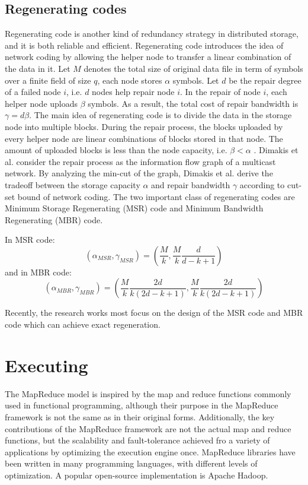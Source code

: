 \documentclass{article} %
\begin{document}
\subsection{Regenerating codes}
Regenerating code is another kind of redundancy strategy in distributed storage, and it is both reliable and efficient. Regenerating code introduces the idea of network coding by allowing the helper node to transfer a linear combination of the data in it. Let $M$ denotes the total size of original data file in term of symbols over a finite field of size $q$, each node stores $\alpha$ symbols. Let $d$ be the repair degree of a failed node $i$, i.e. $d$ nodes help repair node $i$. In the repair of node $i$, each helper node uploads $\beta$ symbols. As a result, the total cost of repair bandwidth is $\gamma = d\beta$. The main idea of regenerating code is to divide the data in the storage node into multiple blocks. During the repair process, the blocks uploaded by every helper node are linear combinations of blocks stored in that node. The amount of uploaded blocks is less than the node capacity, i.e. $\beta < \alpha$ .  Dimakis et al. consider the repair process as the information flow graph of a multicast network. By analyzing the min-cut of the graph, Dimakis et al. derive the tradeoff between the storage capacity $\alpha$  and repair bandwidth $\gamma$  according to cut-set bound of network coding. The two important class of regenerating codes are Minimum Storage Regenerating (MSR) code and Minimum Bandwidth Regenerating (MBR) code.

In MSR code:
\begin{equation}
(\alpha_{MSR}, \gamma_{MSR}) = ( \frac{M}{k}, \frac{M}{k} \frac{d}{d-k+1})
\end{equation}
and in MBR code:
\begin{equation}
(\alpha_{MBR}, \gamma_{MBR}) = ( \frac{M}{k}\frac{2d}{k(2d - k + 1)}, \frac{M}{k} \frac{2d}{k(2d-k+1)})
\end{equation}

Recently, the research works most focus on the design of the MSR code and MBR code which can achieve exact regeneration.

\section{Executing}
	The MapReduce model is inspired by the map and reduce functions commonly used in functional programming, although their purpose in the MapReduce framework is not the same as in their original forms. Additionally, the key contributions of the MapReduce framework are not the actual map and reduce functions, but the scalability and fault-tolerance achieved fro a variety of applications by optimizing the execution engine once. MapReduce libraries have been written in many programming languages, with different levels of optimization. A popular open-source implementation is Apache Hadoop.
\end{document}
